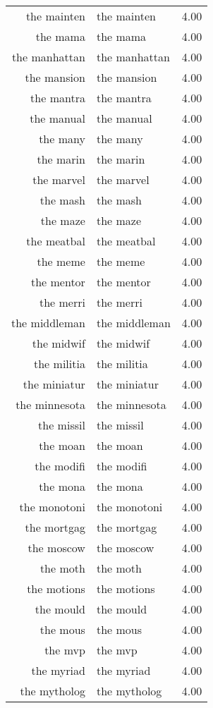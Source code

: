 \begin{table}[ht]
\begin{tabular}{rlr}
  the mainten & the mainten & 4.00 \\ 
  the mama & the mama & 4.00 \\ 
  the manhattan & the manhattan & 4.00 \\ 
  the mansion & the mansion & 4.00 \\ 
  the mantra & the mantra & 4.00 \\ 
  the manual & the manual & 4.00 \\ 
  the many & the many & 4.00 \\ 
  the marin & the marin & 4.00 \\ 
  the marvel & the marvel & 4.00 \\ 
  the mash & the mash & 4.00 \\ 
  the maze & the maze & 4.00 \\ 
  the meatbal & the meatbal & 4.00 \\ 
  the meme & the meme & 4.00 \\ 
  the mentor & the mentor & 4.00 \\ 
  the merri & the merri & 4.00 \\ 
  the middleman & the middleman & 4.00 \\ 
  the midwif & the midwif & 4.00 \\ 
  the militia & the militia & 4.00 \\ 
  the miniatur & the miniatur & 4.00 \\ 
  the minnesota & the minnesota & 4.00 \\ 
  the missil & the missil & 4.00 \\ 
  the moan & the moan & 4.00 \\ 
  the modifi & the modifi & 4.00 \\ 
  the mona & the mona & 4.00 \\ 
  the monotoni & the monotoni & 4.00 \\ 
  the mortgag & the mortgag & 4.00 \\ 
  the moscow & the moscow & 4.00 \\ 
  the moth & the moth & 4.00 \\ 
  the motions & the motions & 4.00 \\ 
  the mould & the mould & 4.00 \\ 
  the mous & the mous & 4.00 \\ 
  the mvp & the mvp & 4.00 \\ 
  the myriad & the myriad & 4.00 \\ 
  the mytholog & the mytholog & 4.00 \\ 

\end{tabular}
\end{table}
